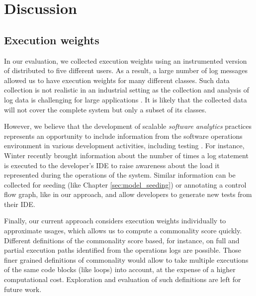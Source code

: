 
\section{Discussion}
\label{sec:cub:discussion}

\subsection{Execution weights}

In our evaluation, we collected execution weights using an instrumented version of \jabref distributed to five different users. As a result, a large number of log messages allowed us to have execution weights for many different classes. Such data collection is not realistic in an industrial setting as the collection and analysis of log data is challenging for large applications \cite{Candido2019}. It is likely that the collected data will not cover the complete system but only a subset of its classes. 

However, we believe that the development of scalable \emph{software analytics} practices \cite{Menzies2013} represents an opportunity to include information from the software operations environment in various development activities, including testing \cite{Candido2019, Chen2018d}. For instance, Winter \etal \cite{Winter2019} recently brought information about the number of times a log statement is executed to the developer's IDE to raise awareness about the load it represented during the operations of the system. Similar information can be collected for seeding (like Chapter \ref{sec:model_seeding}) or annotating a control flow graph, like in our approach, and allow developers to generate new tests from their IDE.

Finally, our current approach considers execution weights individually to approximate usages, which allows us to compute a commonality score quickly. Different definitions of the commonality score based, for instance, on full and partial execution paths identified from the operations logs are possible. Those finer grained definitions of commonality would allow to take multiple executions of the same code blocks (like loops) into account, at the expense of a higher computational cost. Exploration and evaluation of such definitions are left for future work. 


